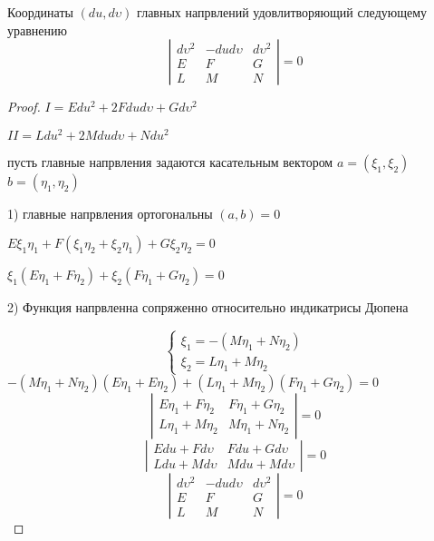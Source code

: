 \begin{theorem}
  Координаты $(du, d\upsilon)$ главных напрвлений удовлитворяющий следующему
  уравнению
  $$
  \left|
  \begin{array}{ccc}
    d\upsilon^2 & -dud\upsilon & d\upsilon^2 \\
    E & F & G \\
    L & M & N
  \end{array}
  \right| = 0
  $$
\end{theorem}

\begin{proof}
  $I = Edu^2 + 2Fdud\upsilon + Gd\upsilon^2$

  $II = Ldu^2 + 2Mdud\upsilon + Ndu^2$

  пусть главные напрвления задаются касательным вектором $a = (\xi_1,\xi_2)$
  $b = (\eta_1, \eta_2)$

  1) главные напрвления ортогональны $(a,b) = 0$

  $E\xi_1 \eta_1 + F(\xi_1 \eta_2 + \xi_2 \eta_1) + G\xi_2 \eta_2 = 0$

  $\xi_1(E\eta_1 + F\eta_2) + \xi_2(F\eta_1 + G\eta_2) = 0$

  2) Функция напрвленна сопряженно относительно индикатрисы Дюпена

  $$
  \left\{
  \begin{array}{c}
    \xi_1 = -(M\eta_1 + N \eta_2) \\
    \xi_2 = L\eta_1 + M \eta_2
  \end{array}
  \right.
  $$
  $-(M\eta_1 + N\eta_2)(E\eta_1 + E\eta_2) + (L\eta_1 + M\eta_2)(F\eta_1 +
  G\eta_2) = 0$
  $$
  \left|
  \begin{array}{cc}
    E\eta_1 + F\eta_2 & F\eta_1 + G\eta_2 \\
    L\eta_1 + M\eta_2 & M\eta_1 + N\eta_2
  \end{array}
  \right| = 0
  $$
  $$
  \left|
  \begin{array}{cc}
    Edu + Fd\upsilon & Fdu + Gd\upsilon \\
    Ldu + Md\upsilon & Mdu + Md\upsilon
  \end{array}
  \right| = 0
  $$
  $$
  \left|
  \begin{array}{ccc}
    d\upsilon^2 & -dud\upsilon & d\upsilon^2 \\
    E & F & G \\
    L & M & N
  \end{array}
  \right| = 0
  $$
\end{proof}

